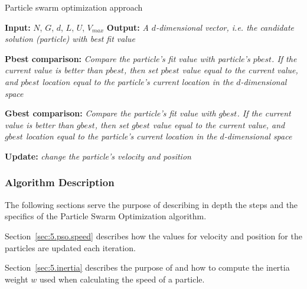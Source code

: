\begin{algorithm}[H]
	\caption{Particle swarm optimization approach} \label{alg:pso}
	\begin{algorithmic}
		\newline
			\textbf{Input:} $N$, $G$, $d$, $L$, $U$, $V_{max}$\newline
			\textbf{Output:} \textit{A $d$-dimensional vector, i.e. the candidate solution (particle) with best fit value}
				\State \begin{varwidth}[t]{.85\textwidth} 
					\textbf{Pbest comparison:} \textit{Compare the particle's fit value with particle's $pbest$.
						If the current value is better than $pbest$, then set $pbest$ value equal to the current value, and $pbest$ location equal to the particle's current location in the $d$-dimensional space}
					\end{varwidth}
				\State \begin{varwidth}[t]{.85\textwidth} 
					\textbf{Gbest comparison:} \textit{Compare the particle's fit value with $gbest$.
						If the current value is better than $gbest$, then set $gbest$ value equal to the current value, and $gbest$ location equal to the particle's current location in the $d$-dimensional space}
					\end{varwidth}
				\State \textbf{Update:} \textit{change the particle's velocity and position}
		\EndProcedure
	\end{algorithmic}
\end{algorithm}

\subsubsection{Algorithm Description}

The following sections serve the purpose of describing in depth the steps
and the specifics of the Particle Swarm Optimization algorithm.

Section~\ref{sec:5.pso.speed} describes how the values for velocity and position
for the particles are updated each iteration.

Section~\ref{sec:5.inertia} describes the purpose of and how to compute
the inertia weight $w$ used when calculating the speed of a particle.

